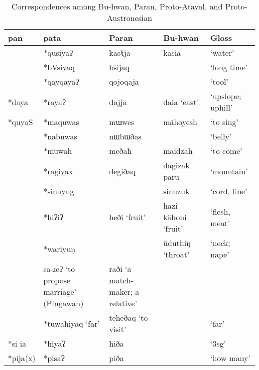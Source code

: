 \begingroup
{}
\renewcommand\arraystretch{1.25}
\begin{longtable}[c]{l>{\raggedright}p{2.7cm}>{\raggedright}p{2.7cm}>{\raggedright}p{2.7cm}l}
\caption{Correspondences among Bu-hwan, Paran, Proto-Atayal, and Proto-Austronesian}
\label{tab:bhandprz}\\
\hline
\ac{pan} & \ac{pata}            & Paran              & Bu-hwan             & Gloss             \\ \hline
         & *qusiyaʔ             & kasʲija            & kasia               & `water'           \\
         & *bVsiyaq             & bsijaq             &                     & `long time'       \\
         & *qayqayaʔ            & qojoqaja           &                     & `tool'            \\
*daya    & *rayaʔ               & dajja              & daia `east'         & `upslope; uphill' \\
*quyaS   & *maquwas             & mɯwes              & măhoyesh            & `to sing'         \\ \hdashline
         & *nabuwas             & nɯbɯðas            &                     & `belly'           \\
         & *muwah               & meðaħ              & maidzah             & `to come'         \\
         & *ragiyax             & degiðaq            & dagizak paru        & `mountain'        \\
         & *sinuyug             &                    & sinuzuk             & `cord, line'      \\
         & *hiʔiʔ               & heði `fruit'       & hazi kăhoni `fruit' & `flesh, meat'     \\
         & *wariyuŋ             &                    & ŭduthiŋ `throat'   & `neck; nape'      \\
       & sa-ɹeʔ `to propose marriage' (Plngawan)       & raði `a match-maker; a relative' &                          &                   \\
         & *tuwahiyaq `far'     & teheðaq `to visit' &                     & `far'             \\
*si ia   & *hiyaʔ               & hiða               &                     & `3\acs{sg}'       \\ \hdashline
*pija(x) & *pisaʔ               & piða               &                     & `how many'        \\

\end{longtable}
